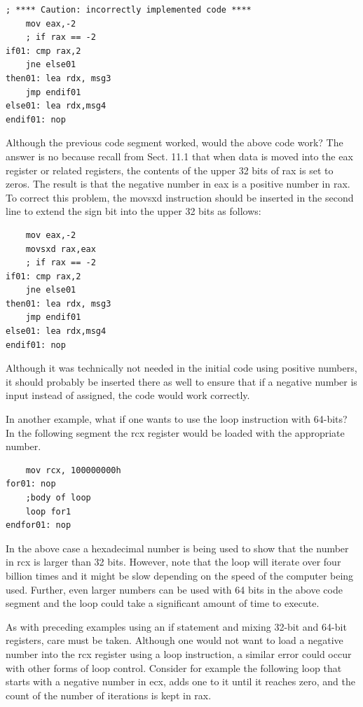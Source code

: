 \documentclass[10pt]{book}
\begin{document}
\begin{verbatim}
; **** Caution: incorrectly implemented code ****
    mov eax,-2
    ; if rax == -2
if01: cmp rax,2
    jne else01
then01: lea rdx, msg3
    jmp endif01
else01: lea rdx,msg4
endif01: nop
\end{verbatim}

Although the previous code segment worked, would the above code work? The answer is no because recall from Sect. 11.1 that when data is moved into the eax register or related registers, the contents of the upper 32 bits of rax is set to zeros. The result is that the negative number in eax is a positive number in rax. To correct this problem, the movsxd instruction should be inserted in the second line to extend the sign bit into the upper 32 bits as follows:


\begin{verbatim}
    mov eax,-2
    movsxd rax,eax
    ; if rax == -2
if01: cmp rax,2
    jne else01
then01: lea rdx, msg3
    jmp endif01
else01: lea rdx,msg4
endif01: nop
\end{verbatim}

Although it was technically not needed in the initial code using positive numbers, it should probably be inserted there as well to ensure that if a negative number is input instead of assigned, the code would work correctly.

In another example, what if one wants to use the loop instruction with 64-bits? In the following segment the rcx register would be loaded with the appropriate number.

\begin{verbatim}
    mov rcx, 100000000h
for01: nop
    ;body of loop
    loop for1
endfor01: nop
\end{verbatim}

In the above case a hexadecimal number is being used to show that the number in rcx is larger than 32 bits. However, note that the loop will iterate over four billion times and it might be slow depending on the speed of the computer being used. Further, even larger numbers can be used with 64 bits in the above code segment and the loop could take a significant amount of time to execute.

As with preceding examples using an if statement and mixing 32-bit and 64-bit registers, care must be taken. Although one would not want to load a negative number into the rcx register using a loop instruction, a similar error could occur with other forms of loop control. Consider for example the following loop that starts with a negative number in ecx, adds one to it until it reaches zero, and the count of the number of iterations is kept in rax.
\end{document}
